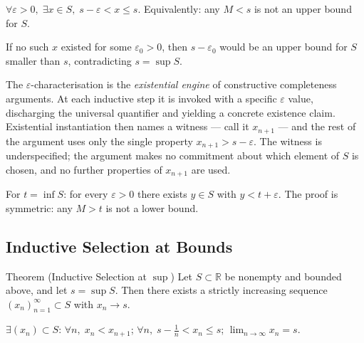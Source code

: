 \begin{remark}
$\forall\varepsilon>0,\;\exists x\in S,\;s-\varepsilon<x\leq s$.
Equivalently: any $M<s$ is not an upper bound for $S$.
\end{remark}

\begin{remark}
If no such $x$ existed for some $\varepsilon_0>0$, then $s-\varepsilon_0$
would be an upper bound for $S$ smaller than $s$, contradicting $s=\sup S$.
\end{remark}

\begin{remark}
The $\varepsilon$-characterisation is the \emph{existential engine} of
constructive completeness arguments. At each inductive step it is invoked
with a specific $\varepsilon$ value, discharging the universal quantifier
and yielding a concrete existence claim. Existential instantiation then
names a witness — call it $x_{n+1}$ — and the rest of the argument uses
only the single property $x_{n+1}>s-\varepsilon$. The witness is
underspecified; the argument makes no commitment about which element of $S$
is chosen, and no further properties of $x_{n+1}$ are used.
\end{remark}

\begin{remark}
For $t=\inf S$: for every $\varepsilon>0$ there exists $y\in S$ with
$y<t+\varepsilon$. The proof is symmetric: any $M>t$ is not a lower bound.
\end{remark}

\subsection*{Inductive Selection at Bounds}
\label{subsec:inductive-selection}

\begin{theorembox}{Theorem (Inductive Selection at $\sup$)}
\label{thm:inductive-selection}
Let $S\subset\mathbb{R}$ be nonempty and bounded above, and let
$s=\sup S$. Then there exists a strictly increasing sequence
$(x_n)_{n=1}^{\infty}\subset S$ with $x_n\to s$.
\end{theorembox}

\begin{remark}
$\exists(x_n)\subset S$: $\forall n,\;x_n<x_{n+1}$;\;
$\forall n,\;s-\tfrac{1}{n}<x_n\leq s$;\;
$\lim_{n\to\infty}x_n=s$.
\end{remark}

